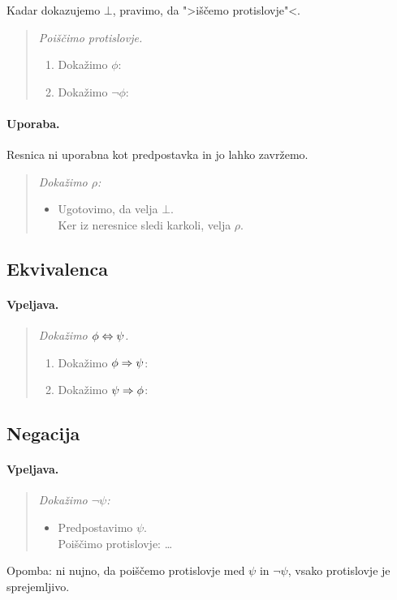 Kadar dokazujemo $\bot$, pravimo, da ">iščemo protislovje"<.

\begin{quote}
  \sl
  Poiščimo protislovje.
  \begin{enumerate}
  \item Dokažimo $\phi$: \quad {}
  \item Dokažimo $\lnot \phi$: \quad {}
  \end{enumerate}
\end{quote}

\paragraph{Uporaba.}
Resnica ni uporabna kot predpostavka in jo lahko zavržemo.

\begin{quote}
  \sl
  Dokažimo $\rho$:
  \begin{itemize}
  \item[]
    Ugotovimo, da velja $\bot$.\\
    Ker iz neresnice sledi karkoli, velja $\rho$.
  \end{itemize}
\end{quote}

\subsection{Ekvivalenca}

\paragraph{Vpeljava.}
\begin{quote}
  \sl
  Dokažimo $\phi \Leftrightarrow \psi$.
  \begin{enumerate}
  \item Dokažimo $\phi \Rightarrow \psi$: \quad {}
  \item Dokažimo $\psi \Rightarrow \phi$: \quad {}
  \end{enumerate}
\end{quote}

\subsection{Negacija}

\paragraph{Vpeljava.}
\begin{quote}
  \sl
  Dokažimo $\lnot \psi$:
  \begin{itemize}
  \item[] Predpostavimo $\psi$. \\
          Poiščimo protislovje: \quad \dots
  \end{itemize}
\end{quote}
%
Opomba: ni nujno, da poiščemo protislovje med $\psi$ in $\lnot\psi$, vsako protislovje je sprejemljivo.

